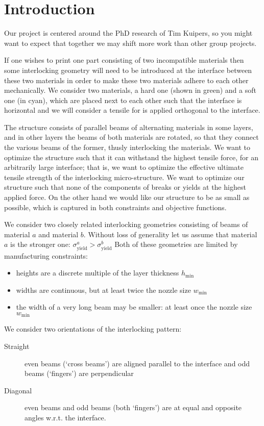 \section{Introduction}
Our project is centered around the PhD research of Tim Kuipers, so you might want to expect that together we may shift more work than other group projects.

\medskip

If one wishes to print one part consisting of two incompatible materials then some interlocking geometry will need to be introduced at the interface between these two materials in order to make these two materials adhere to each other mechanically.
We consider two materials, a hard one (shown in green) and a soft one (in cyan), which are placed next to each other such that the interface is horizontal
and we will consider a tensile for is applied orthogonal to the interface.

The structure consists of parallel beams of alternating materials in some layers, and in other layers the beams of both materials are rotated, so that they connect the various beams of the former, thusly interlocking the materials.
We want to optimize the structure such that it can withstand the highest tensile force, for an arbitrarily large interface;
that is, we want to optimize the effective ultimate tensile strength of the interlocking micro-structure.
We want to optimize our structure such that none of the components of breaks or yields at the highest applied force.
On the other hand we would like our structure to be as small as possible, which is captured in both constraints and objective functions.

We consider two closely related interlocking geometries consisting of beams of material $a$ and material $b$.
Without loss of generality let us assume that material $a$ is the stronger one: $\sigma^a_\text{yield} > \sigma^b_\text{yield} $
Both of these geometries are limited by manufacturing constraints:
\begin{itemize}
	\item heights are a discrete multiple of the layer thickness $h_\text{min}$
	\item widths are continuous, but at least twice the nozzle size $w_\text{min}$
	\item the width of a very long beam may be smaller: at least once the nozzle size $w_\text{min}$
\end{itemize}


We consider two orientations of the interlocking pattern:
\begin{description}
	\item[Straight] even beams (`cross beams') are aligned parallel to the interface and odd beams (`fingers') are perpendicular
	\item[Diagonal] even beams and odd beams (both `fingers') are at equal and opposite angles w.r.t. the interface.
\end{description}

